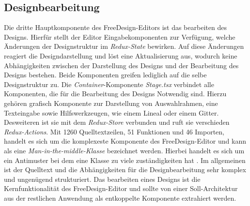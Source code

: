 \subsection{Designbearbeitung}
Die dritte Hauptkomponente des FreeDesign-Editors ist das bearbeiten des Designs. Hierfür stellt der Editor Eingabekomponenten zur Verfügung, welche Änderungen der Designstruktur im \emph{Redux-State} bewirken. Auf diese Änderungen reagiert die Designdarstellung und löst eine Aktualisierung aus, wodurch keine Abhängigkeiten zwischen der Darstellung des Designs und der Bearbeitung des Designs bestehen. Beide Komponenten greifen lediglich auf die selbe Designstruktur zu.  
Die \emph{Container}-Komponente \emph{Stage.tsx} verbindet alle Komponenten, die für die Bearbeitung des Designs Notwendig sind. Hierzu gehören grafisch Komponente zur Darstellung von Auswahlrahmen, eine Texteingabe sowie Hilfswerkzeugen, wie einem Lineal oder einem Gitter. 
Desweiteren ist sie mit dem \emph{Redux-Store} verbunden und ruft sie verschieden \emph{Redux-Actions}. 
Mit  1260 Quelltextzeilen, 51 Funktionen und 46 Importen, handelt es sich um die komplexeste Komponente des FreeDesign-Editor und kann als eine \emph{Man-in-the-middle-Klasse} bezeichnet werden. Hierbei handelt es sich um ein Antimuster bei dem eine Klasse zu viele zuständigkeiten hat \autocite[vgl.][619]{Geirhos2015}.
Im allgemeinen ist der Quelltext und die Abhängigkeiten für die Designbearbeitung sehr komplex und ungenügend strukturiert. Das bearbeiten eines Designs ist die Kernfunktionalität des FreeDesign-Editor und sollte von einer Soll-Architektur aus der restlichen Anwendung als entkoppelte Komponente extrahiert werden. 

\begin{multicols}{2}    
    
\end{multicols}
